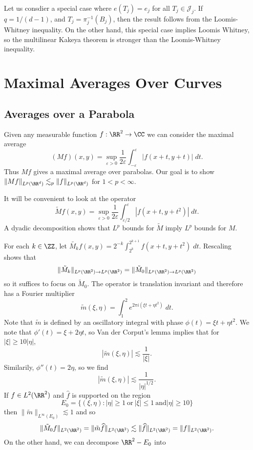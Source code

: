 Let us consdier a special case where $e(T_j) = e_j$ for all $T_j \in \mathcal{J}_j$. If $q = 1/(d-1)$, and $T_j = \pi_j^{-1}(B_j)$, then the result follows from the Loomis-Whitney inequality. On the other hand, this special case implies Loomis Whitney, so the multilinear Kakeya theorem is stronger than the Loomis-Whitney inequality.


























\chapter{Maximal Averages Over Curves}

\section{Averages over a Parabola}

Given any measurable function $f: \RR^2 \to \CC$ we can consider the maximal average
%
\[ (Mf)(x,y) = \sup_{\varepsilon > 0} \frac{1}{2\varepsilon} \int_{-\varepsilon}^\varepsilon|f(x+t,y+t)|\; dt. \]
%
Thus $Mf$ gives a maximal average over parabolas. Our goal is to show $\| Mf \|_{L^p(\RR^d)} \lesssim_p \| f \|_{L^p(\RR^d)}$ for $1 < p < \infty$.

It will be convenient to look at the operator
%
\[ \tilde{M} f(x,y) = \sup_{\varepsilon > 0} \frac{1}{2\varepsilon} \int_{\varepsilon/2}^{\varepsilon} |f(x+t,y+t^2)|\; dt. \]
%
A dyadic decomposition shows that $L^p$ bounds for $\tilde{M}$ imply $L^p$ bounds for $M$.

For each $k \in \ZZ$, let $\tilde{M_k} f(x,y) = 2^{-k} \int_{2^k}^{2^{k+1}} f(x+t,y+t^2)\; dt$. Rescaling shows that
%
\[ \| \tilde{M}_k \|_{L^p(\RR^2) \to L^p(\RR^2)} = \| \tilde{M}_0 \|_{L^p(\RR^2) \to L^p(\RR^2)} \]
%
so it suffices to focus on $\tilde{M}_0$. The operator is translation invariant and therefore has a Fourier multiplier
%
\[ \tilde{m}(\xi,\eta) = \int_1^2 e^{2 \pi i (\xi t + \eta t^2)}\; dt. \]
%
Note that $\tilde{m}$ is defined by an oscillatory integral with phase $\phi(t) = \xi t + \eta t^2$. We note that $\phi'(t) = \xi + 2 \eta t$, so Van der Corput's lemma implies that for $|\xi| \geq 10|\eta|$,
%
\[ |\tilde{m}(\xi,\eta)| \lesssim \frac{1}{|\xi|}. \]
%
Similarily, $\phi''(t) = 2 \eta$, so we find
%
\[ |\tilde{m}(\xi,\eta)| \lesssim \frac{1}{|\eta|^{1/2}}. \]
%
If $f \in L^2(\RR^2)$ and $\widehat{f}$ is supported on the region
%
\[ E_0 = \{ (\xi,\eta) : |\eta| \geq 1\ \text{or}\ |\xi| \leq 1\ \text{and} |\eta| \geq 10 \} \]
%
then $\| \tilde{m} \|_{L^\infty(E_0)} \lesssim 1$ and so
%
\[ \| \tilde{M}_0 f \|_{L^2(\RR^2)} = \| \tilde{m} \widehat{f} \|_{L^2(\RR^2)} \lesssim \| \widehat{f} \|_{L^2(\RR^2)} = \| f \|_{L^2(\RR^2)}. \]
%
On the other hand, we can decompose $\RR^2 - E_0$ into

